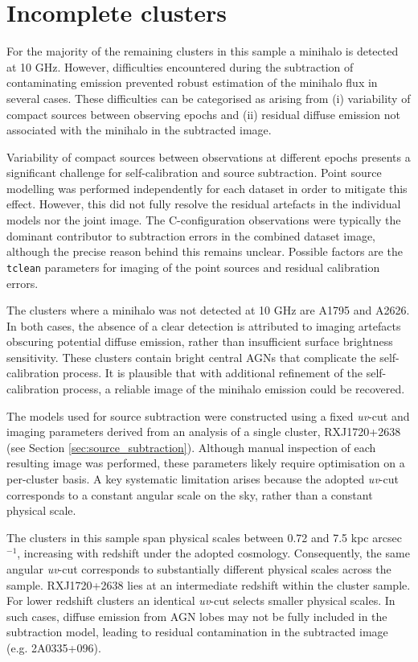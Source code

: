 \section{Incomplete clusters}
For the majority of the remaining clusters in this sample a minihalo is detected at 10 GHz. However, difficulties encountered during the subtraction of contaminating emission prevented robust estimation of the minihalo flux in several cases. These difficulties can be categorised as arising from (i) variability of compact sources between observing epochs and (ii) residual diffuse emission not associated with the minihalo in the subtracted image. 

Variability of compact sources between observations at different epochs presents a significant challenge for self-calibration and source subtraction. Point source modelling was performed independently for each dataset in order to mitigate this effect. However, this did not fully resolve the residual artefacts in the individual models nor the joint image. The C-configuration observations were typically the dominant contributor to subtraction errors in the combined dataset image, although the precise reason behind this remains unclear. Possible factors are the \texttt{tclean} parameters for imaging of the point sources and residual calibration errors.

The clusters where a minihalo was not detected at 10 GHz are A1795 and A2626. In both cases, the absence of a clear detection is attributed to imaging artefacts obscuring potential diffuse emission, rather than insufficient surface brightness sensitivity. These clusters contain bright central AGNs that complicate the self-calibration process. It is plausible that with additional refinement of the self-calibration process, a reliable image of the minihalo emission could be recovered. 

The models used for source subtraction were constructed using a fixed \textit{uv}-cut and imaging parameters derived from an analysis of a single cluster, RXJ1720+2638 (see Section \ref{sec:source_subtraction}). Although manual inspection of each resulting image was performed, these parameters likely require optimisation on a per-cluster basis. A key systematic limitation arises because the adopted \textit{uv}-cut corresponds to a constant angular scale on the sky, rather than a constant physical scale.

The clusters in this sample span physical scales between 0.72 and 7.5 kpc arcsec$^{-1}$, increasing with redshift under the adopted cosmology. Consequently, the same angular \textit{uv}-cut corresponds to substantially different physical scales across the sample. RXJ1720+2638 lies at an intermediate redshift within the cluster sample. For lower redshift clusters an identical \textit{uv}-cut selects smaller physical scales. In such cases, diffuse emission from AGN lobes may not be fully included in the subtraction model, leading to residual contamination in the subtracted image (e.g. 2A0335+096). 

